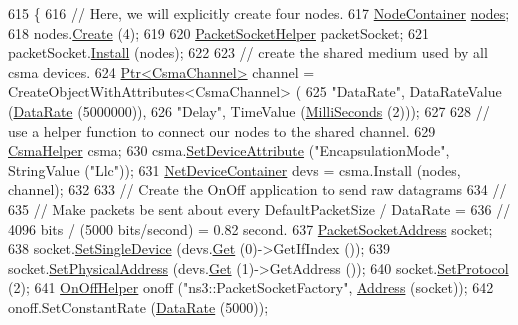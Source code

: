 \begin{DoxyCode}
615 \{
616   \textcolor{comment}{// Here, we will explicitly create four nodes.}
617   \hyperlink{classns3_1_1NodeContainer}{NodeContainer} \hyperlink{visualizer-ideas_8txt_a3e1b3808014a2c68ab0cd0182e041be2}{nodes};
618   nodes.\hyperlink{classns3_1_1NodeContainer_a787f059e2813e8b951cc6914d11dfe69}{Create} (4);
619 
620   \hyperlink{classns3_1_1PacketSocketHelper}{PacketSocketHelper} packetSocket;
621   packetSocket.\hyperlink{classns3_1_1PacketSocketHelper_a33f449fee7fd10411949d17feba6d33e}{Install} (nodes);
622 
623   \textcolor{comment}{// create the shared medium used by all csma devices.}
624   \hyperlink{classns3_1_1Ptr}{Ptr<CsmaChannel>} channel = CreateObjectWithAttributes<CsmaChannel> (
625       \textcolor{stringliteral}{"DataRate"}, DataRateValue (\hyperlink{classns3_1_1DataRate}{DataRate} (5000000)),
626       \textcolor{stringliteral}{"Delay"}, TimeValue (\hyperlink{group__timecivil_gaf26127cf4571146b83a92ee18679c7a9}{MilliSeconds} (2)));
627 
628   \textcolor{comment}{// use a helper function to connect our nodes to the shared channel.}
629   \hyperlink{classns3_1_1CsmaHelper}{CsmaHelper} csma;
630   csma.\hyperlink{classns3_1_1CsmaHelper_a741c31b2526e3570cc62c9d7d9667ca9}{SetDeviceAttribute} (\textcolor{stringliteral}{"EncapsulationMode"}, StringValue (\textcolor{stringliteral}{"Llc"}));
631   \hyperlink{classns3_1_1NetDeviceContainer}{NetDeviceContainer} devs = csma.Install (nodes, channel);
632 
633   \textcolor{comment}{// Create the OnOff application to send raw datagrams}
634   \textcolor{comment}{//}
635   \textcolor{comment}{// Make packets be sent about every DefaultPacketSize / DataRate = }
636   \textcolor{comment}{// 4096 bits / (5000 bits/second) = 0.82 second.}
637   \hyperlink{classns3_1_1PacketSocketAddress}{PacketSocketAddress} socket;
638   socket.\hyperlink{classns3_1_1PacketSocketAddress_ad1caa016f4d27c9d5f2c06dbfc53f8a3}{SetSingleDevice} (devs.\hyperlink{classns3_1_1NetDeviceContainer_a677d62594b5c9d2dea155cc5045f4d0b}{Get} (0)->GetIfIndex ());
639   socket.\hyperlink{classns3_1_1PacketSocketAddress_a9452f9410a97e57344e464e25c2ab0f3}{SetPhysicalAddress} (devs.\hyperlink{classns3_1_1NetDeviceContainer_a677d62594b5c9d2dea155cc5045f4d0b}{Get} (1)->GetAddress ());
640   socket.\hyperlink{classns3_1_1PacketSocketAddress_a9020962e39c238277f3b2f0de605647a}{SetProtocol} (2);
641   \hyperlink{classns3_1_1OnOffHelper}{OnOffHelper} onoff (\textcolor{stringliteral}{"ns3::PacketSocketFactory"}, \hyperlink{classns3_1_1Address}{Address} (socket));
642   onoff.SetConstantRate (\hyperlink{classns3_1_1DataRate}{DataRate} (5000));

\end{DoxyCode}
